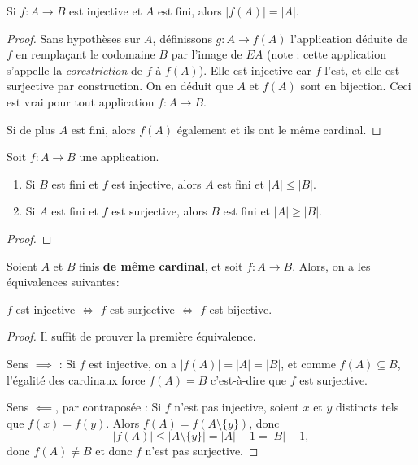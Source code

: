 \begin{proposition}
Si $f:A\to B$ est injective et $A$ est fini, alors $|f(A)|=|A|$.
\end{proposition}
\begin{proof}
Sans hypothèses sur $A$, définissons $g : A\to f(A)$ l'application déduite de $f$ en remplaçant le codomaine $B$ par l'image de $EA$ (note : cette application s'appelle la \emph{corestriction} de $f$ à $f(A)$). Elle est injective car $f$ l'est, et elle est surjective par construction. On en déduit que $A$ et $f(A)$ sont en bijection. Ceci est vrai pour tout application $f : A\to B$.

Si de plus $A$ est fini, alors $f(A)$ également et ils ont le même cardinal.
\end{proof}

\begin{proposition}Soit $f : A\to B$ une application.
\begin{enumerate}
\item Si $B$ est fini et $f$ est injective, alors $A$ est fini et $|A|\leq |B|$.
\item Si $A$ est fini et $f$ est surjective, alors $B$ est fini et $|A|\geq |B|$.
\end{enumerate}
\end{proposition}
\begin{proof}
\end{proof}

\begin{theoreme}[IMPORTANT]
Soient $A$ et $B$ finis \textbf{de même cardinal}, et soit $f : A\to B$. Alors, on a les équivalences suivantes:
\begin{center}
$f$ est injective $\iff$ $f$ est surjective $\iff$ $f$ est  bijective.
\end{center}
\end{theoreme}
\begin{proof}
Il suffit de prouver la première équivalence.

Sens $\implies$ : Si $f$ est injective, on a $|f(A)|=|A|=|B|$, et comme $f(A)\subseteq B$, l'égalité des cardinaux force $f(A)=B$ c'est-à-dire que $f$ est surjective.

Sens $\impliedby$, par contraposée : Si $f$ n'est pas injective, soient $x$ et $y$ distincts tels que $f(x)=f(y)$. Alors $f(A) = f(A\setminus \{y\})$, donc 
\[
|f(A)| \leq |A\setminus \{y\}| = |A|-1 = |B|-1,
\]
donc $f(A) \neq B$ et donc $f$ n'est pas surjective.
\end{proof}

